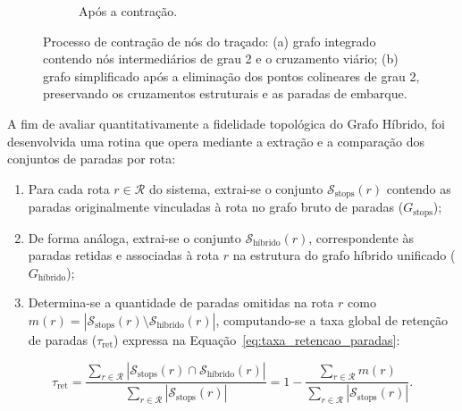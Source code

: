 \documentclass[cic,tc]{infufrgs}
\begin{document}
\begin{figure}[H]
\begin{subfigure}[b]{0.48\textwidth}
        \caption{Após a contração.}
        \label{fig:contracao_depois}
    \end{subfigure}
    \caption{Processo de contração de nós do traçado: (a) grafo integrado contendo nós intermediários de grau 2 e o cruzamento viário; (b) grafo simplificado após a eliminação dos pontos colineares de grau 2, preservando os cruzamentos estruturais e as paradas de embarque.}
    \label{fig:contracao_shape_nodes}
\end{figure}

A fim de avaliar quantitativamente a fidelidade topológica do Grafo Híbrido, foi desenvolvida uma rotina que opera mediante a extração e a comparação dos conjuntos de paradas por rota:

\begin{enumerate}
    \item Para cada rota $r \in \mathcal{R}$ do sistema, extrai-se o conjunto $\mathcal{S}_{\text{stops}}(r)$ contendo as paradas originalmente vinculadas à rota no grafo bruto de paradas ($G_{\text{stops}}$);
    \item De forma análoga, extrai-se o conjunto $\mathcal{S}_{\text{híbrido}}(r)$, correspondente às paradas retidas e associadas à rota $r$ na estrutura do grafo híbrido unificado ($G_{\text{híbrido}}$);
    \item Determina-se a quantidade de paradas omitidas na rota $r$ como $m(r) = |\mathcal{S}_{\text{stops}}(r) \setminus \mathcal{S}_{\text{híbrido}}(r)|$, computando-se a taxa global de retenção de paradas ($\tau_{\text{ret}}$) expressa na Equação~\ref{eq:taxa_retencao_paradas}:
\end{enumerate}

\begin{equation}
\tau_{\text{ret}} = \frac{\sum_{r \in \mathcal{R}} |\mathcal{S}_{\text{stops}}(r) \cap \mathcal{S}_{\text{híbrido}}(r)|}{\sum_{r \in \mathcal{R}} |\mathcal{S}_{\text{stops}}(r)|} = 1 - \frac{\sum_{r \in \mathcal{R}} m(r)}{\sum_{r \in \mathcal{R}} |\mathcal{S}_{\text{stops}}(r)|}.
\label{eq:taxa_retencao_paradas}
\end{equation}
\end{document}
